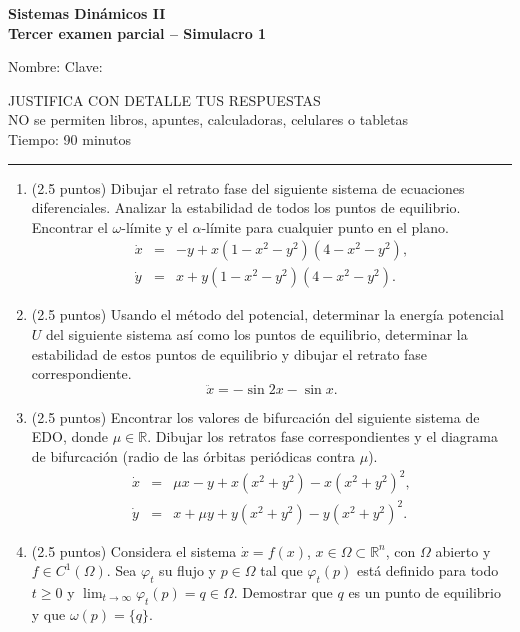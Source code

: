 \documentclass[11pt]{article}
\begin{document}
\textbf{Sistemas Dinámicos II}\\
\textbf{Tercer examen parcial -- Simulacro 1}

\vspace{0.6cm}
Nombre: \underline{\hspace{9cm}} \quad Clave: \underline{\hspace{3cm}}

\vspace{0.5cm}
\begin{center}
JUSTIFICA CON DETALLE TUS RESPUESTAS\\
NO se permiten libros, apuntes, calculadoras, celulares o tabletas\\
Tiempo: 90 minutos
\end{center}
\vspace{-0.2cm}
\rule{\textwidth}{0.4pt}
\vspace{0.2cm}

\begin{enumerate}
\item (2.5 puntos) Dibujar el retrato fase del siguiente sistema de ecuaciones diferenciales. Analizar la estabilidad de todos los puntos de equilibrio. Encontrar el $\omega$-límite y el $\alpha$-límite para cualquier punto en el plano.
\begin{eqnarray*}
\dot x &=& -y+x(1-x^2-y^2)(4-x^2-y^2), \\
\dot y &=& x+y(1-x^2-y^2)(4-x^2-y^2).
\end{eqnarray*}
\vspace{0.15cm}

\item (2.5 puntos) Usando el método del potencial, determinar la energía potencial $U$ del siguiente sistema así como los puntos de equilibrio, determinar la estabilidad de estos puntos de equilibrio y dibujar el retrato fase correspondiente.
$$\ddot x=-\sin 2x-\sin x.$$
\vspace{0.15cm}

\item (2.5 puntos) Encontrar los valores de bifurcación del siguiente sistema de EDO, donde $\mu\in\mathbb{R}$. Dibujar los retratos fase correspondientes y el diagrama de bifurcación (radio de las órbitas periódicas contra $\mu$).
\begin{eqnarray*}
\dot x &=& \mu x-y+x(x^2+y^2)-x(x^2+y^2)^2, \\
\dot y &=& x+\mu y+y(x^2+y^2)-y(x^2+y^2)^2.
\end{eqnarray*}
\vspace{0.15cm}

\item (2.5 puntos) Considera el sistema $\dot x=f(x)$, $x\in\Omega\subset\mathbb{R}^n$, con $\Omega$ abierto y $f\in C^1(\Omega)$. Sea $\varphi_t$ su flujo y $p\in\Omega$ tal que $\varphi_t(p)$ está definido para todo $t\ge0$ y $\lim_{t\to\infty}\varphi_t(p)=q\in\Omega$. Demostrar que $q$ es un punto de equilibrio y que $\omega(p)=\{q\}$.
\vspace{0.15cm}

\end{enumerate}
\end{document}
